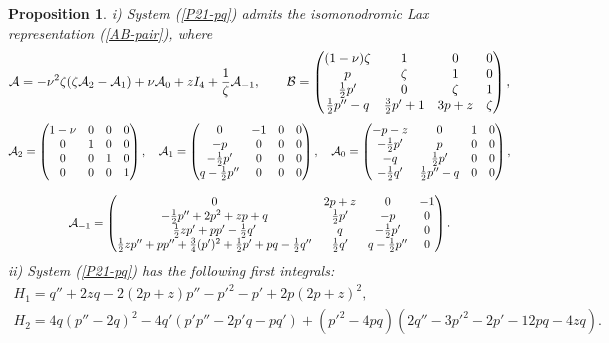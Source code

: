 \documentclass[11pt]{article}
\theoremstyle{plain}
\newtheorem{proposition}{Proposition}
\theoremstyle{definition}
\begin{document}
\begin{proposition} 
i) System (\ref{P21-pq}) admits the isomonodromic Lax representation (\ref{AB-pair}), where
\begin{equation}\label{AB-P21-pq}
 {\cal A}= -\nu^2\zeta(\zeta{\cal A}_2-{\cal A}_1)
  +\nu{\cal A}_0+zI_4+\frac{1}{\zeta}{\cal A}_{-1},\qquad
 {\cal B}=\begin{pmatrix}
  (1-\nu)\zeta & 1 & 0 & 0\\
   p & \zeta & 1 & 0\\
   \frac{1}{2}p' & 0 & \zeta & 1 \\
   \frac{1}{2}p''-q & \frac{3}{2}p'+1 & 3p+z &\zeta
\end{pmatrix},
\end{equation}
\begin{gather*}
 {\cal A}_2=\begin{pmatrix}
  1-\nu & 0 & 0 & 0\\
   0 & 1 & 0 & 0\\
   0 & 0 & 1 & 0 \\
   0 & 0 & 0 & 1
  \end{pmatrix},\quad
 {\cal A}_1=\begin{pmatrix}
   0 & -1 & 0 & 0\\
   -p & 0 & 0 & 0\\
   -\frac{1}{2}p' & 0 & 0 & 0 \\
   q-\frac{1}{2}p'' & 0 & 0 & 0
  \end{pmatrix},\quad
 {\cal A}_0=\begin{pmatrix}
   -p-z & 0 & 1 & 0\\
   -\frac{1}{2}p' & p & 0 & 0\\
   -q & \frac{1}{2}p' & 0 & 0 \\
   -\frac{1}{2}q' & \frac{1}{2}p''-q & 0 & 0
  \end{pmatrix},\\[3mm]
 {\cal A}_{-1}=\begin{pmatrix}
   0 & 2p+z & 0 & -1 \\
 -\frac{1}{2}p''+2p^2+zp+q & \frac{1}{2}p' & -p & 0 \\
 \frac{1}{2}zp'+pp'-\frac{1}{2}q' & q & -\frac{1}{2}p' & 0 \\
 \frac{1}{2}zp''+pp''+\frac{3}{4}(p')^2+\frac{1}{2}p'+pq-\frac{1}{2}q'' & \frac{1}{2}q' & q-\frac{1}{2}p'' & 0 \\
  \end{pmatrix}.
\end{gather*}
ii) System (\ref{P21-pq}) has the following first integrals:
\begin{gather*}
H_1=q'' +2zq-2(2p+z)p''-p'^2-p'+2p(2p+z)^2,\\
H_2= 4q(p''-2q)^2-4q'(p'p''-2p'q-pq')+(p'^2-4pq)(2q''-3p'^2-2p'-12pq-4zq).
\end{gather*}
\end{proposition}
\end{document}
